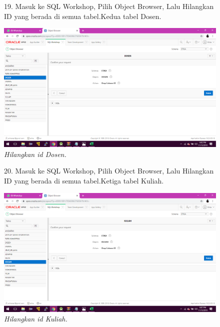 \begin{enumerate}
\begin{figure}
\item[19.]Masuk ke SQL Workshop, Pilih Object Browser, Lalu Hilangkan ID yang berada di semua tabel.Kedua tabel Dosen.   
    \begin{center}
    \includegraphics[scale=0.3]{figures/28.png}
    \caption{\textit{Hilangkan id Dosen.}}
    \end{center}
    \label{gambar}
    \end{figure}

\begin{figure}
\item[20.]Masuk ke SQL Workshop, Pilih Object Browser, Lalu Hilangkan ID yang berada di semua tabel.Ketiga tabel Kuliah.       
    \begin{center}
    \includegraphics[scale=0.3]{figures/31.png}
    \caption{\textit{Hilangkan id Kuliah.}}
    \end{center}
    \label{gambar}
    \end{figure}


\end{enumerate}
